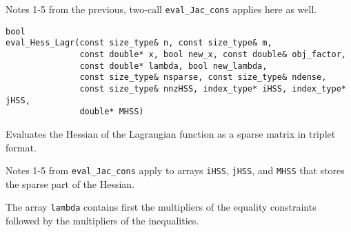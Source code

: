  Notes 1-5 from the previous, two-call \texttt{eval\_Jac\_cons} applies here as well.



\begin{lstlisting} 
bool
eval_Hess_Lagr(const size_type& n, const size_type& m, 
               const double* x, bool new_x, const double& obj_factor,
               const double* lambda, bool new_lambda,
               const size_type& nsparse, const size_type& ndense, 
               const size_type& nnzHSS, index_type* iHSS, index_type* jHSS,
               double* MHSS)
\end{lstlisting} 

\noindent Evaluates the Hessian of the Lagrangian function as a sparse matrix in triplet format. 

 
 
 Notes 1-5 from \texttt{eval\_Jac\_cons} apply to arrays \texttt{iHSS}, \texttt{jHSS}, and \texttt{MHSS} that stores the sparse part of the Hessian.

 The array \texttt{lambda} contains first the multipliers of the equality constraints followed by the multipliers of the inequalities.


